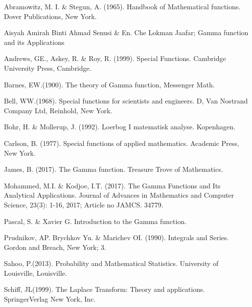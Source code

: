 \documentclass[11pt]{report}
\begin{document}
	\begin{description}
		\item Abramowitz, M. I. \& Stegun, A. (1965). Handbook of Mathematical functions. Dover Publications, New York.
		
		\item Aisyah Amirah Binti Ahmad Senusi \& En. Che Lokman Jaafar; Gamma function and its Applications
		
		\item Andrews, GE., Askey, R. \& Roy, R. (1999). Special Functions. Cambridge University Press, Cambridge.
		
		\item Barnes, EW.(1900). The theory of Gamma function, Messenger Math.
		
		\item Bell, WW.(1968). Special functions for scientists and engineers. D, Van Nostrand Company Ltd, Reinhold, New York.
		
		\item Bohr, H. \& Mollerup, J. (1992). Loerbog I matematisk analyse. Kopenhagen.
		
		\item Carlson, B. (1977). Special functions of applied mathematics. Academic Press, New York.
		
		\item James, B. (2017). The Gamma function. Treasure Trove of Mathematics.
		
		\item Mohammed, M.I. \& Kodjoe, I.T. (2017). The Gamma Functions and Its Analytical Applications. Journal of Advances in Mathematics and Computer Science, 23(3): 1-16, 2017; Article no JAMCS. 34779.
		
		\item Pascal, S. \& Xavier G. Introduction to the Gamma function.
		
		\item Prudnikov, AP. Brychkov Yu. \& Marichev OI. (1990). Integrals and Series. Gordon and Breach, New York; 3.
		
		\item Sahoo, P.(2013). Probability and Mathematical Statistics. University of Louisville, Louisville.
		
		\item Schiff, JL(1999). The Laplace Transform: Theory and applications. SpringerVerlag New York, Inc.
	\end{description}
	
\end{document}
